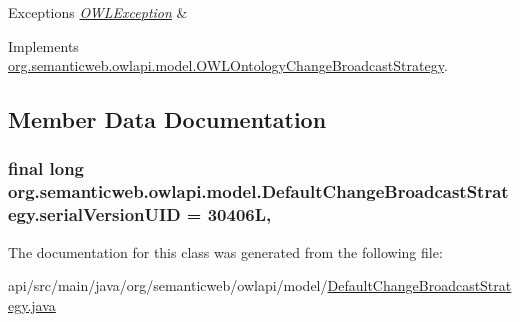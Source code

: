 \begin{DoxyExceptions}{Exceptions}
{\em \hyperlink{classorg_1_1semanticweb_1_1owlapi_1_1model_1_1_o_w_l_exception}{O\-W\-L\-Exception}} & \\
\hline
\end{DoxyExceptions}


Implements \hyperlink{interfaceorg_1_1semanticweb_1_1owlapi_1_1model_1_1_o_w_l_ontology_change_broadcast_strategy_aff0af05060687595e75516babad11ad3}{org.\-semanticweb.\-owlapi.\-model.\-O\-W\-L\-Ontology\-Change\-Broadcast\-Strategy}.



\subsection{Member Data Documentation}
\hypertarget{classorg_1_1semanticweb_1_1owlapi_1_1model_1_1_default_change_broadcast_strategy_a9c55a0018194abc694ed89403c868e4a}{
\subsubsection[{serial\-Version\-U\-I\-D}]{\setlength{\rightskip}{0pt plus 5cm}final long org.\-semanticweb.\-owlapi.\-model.\-Default\-Change\-Broadcast\-Strategy.\-serial\-Version\-U\-I\-D = 30406\-L\hspace{0.3cm}{\ttfamily [static]}, {\ttfamily [private]}}}\label{classorg_1_1semanticweb_1_1owlapi_1_1model_1_1_default_change_broadcast_strategy_a9c55a0018194abc694ed89403c868e4a}


The documentation for this class was generated from the following file\-:\begin{DoxyCompactItemize}
\item 
api/src/main/java/org/semanticweb/owlapi/model/\hyperlink{_default_change_broadcast_strategy_8java}{Default\-Change\-Broadcast\-Strategy.\-java}\end{DoxyCompactItemize}

